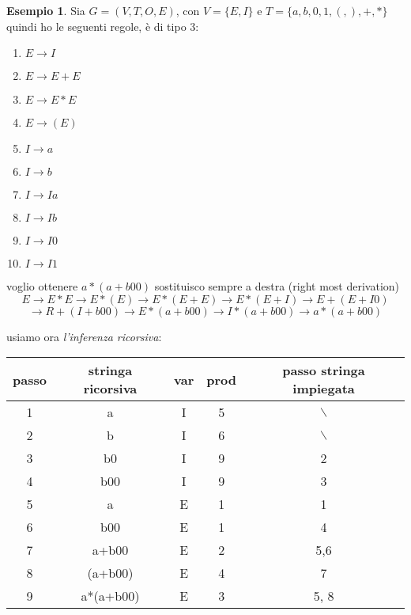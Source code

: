 \documentclass[a4paper]{report}
\theoremstyle{definition}%
\newtheorem*{esempio}{Esempio}
\begin{document}
\begin{esempio}
Sia $G=(V,T,O,E)$, con $V=\{E,I\}$ e $T=\{a,b,0,1,(,),+,*\}$ 
quindi ho le seguenti regole, è di tipo 3:
\begin{enumerate}
\item $E\to I$
\item $E\to E+E$
\item $E\to E*E$
\item $E\to (E)$
\item $I\to a$
\item $I\to b$
\item $I\to Ia$
\item $I\to Ib$
\item $I\to I0$
\item $I\to I1$
\end{enumerate}
voglio ottenere $a*(a+b00)$ 
sostituisco sempre a destra (right most derivation)
$$E\to E*E\to E*(E)\to E*(E+E)\to E*(E+I)\to E+(E+I0)$$
$$\to R+(I+b00)\to E*(a+b00)\to I*(a+b00)\to a*(a+b00)$$

usiamo ora \textit{l'inferenza ricorsiva}:
\begin{center}
\begin{tabular}{|c|c|c|c|c|}
  \toprule passo & stringa ricorsiva & var & prod & passo stringa impiegata\\
\midrule 1 & a & I & 5 & $\backslash$ \\
\hline
2 & b & I & 6 & $\backslash$ \\ 
\hline
3 & b0 & I & 9 & 2\\
\hline
4 & b00 & I & 9 & 3\\
\hline
5 & a & E & 1 & 1 \\
\hline
6 & b00 & E & 1 & 4\\
\hline
7 & a+b00 & E & 2 & 5,6\\
\hline
8 & (a+b00) & E & 4 & 7\\
\hline
9 &a*(a+b00) & E & 3 & 5, 8\\
\hline
\end{tabular}
\end{center}
\end{esempio}
  
\end{document}
